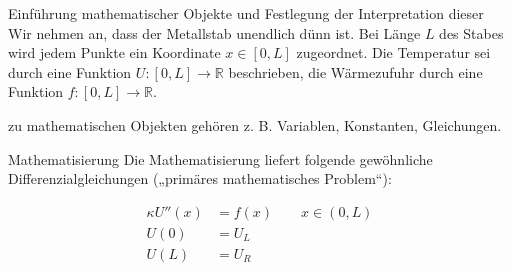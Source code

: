 \documentclass{mycourse}
\begin{document}
\begin{seg}{Einführung mathematischer Objekte und Festlegung der Interpretation dieser}
Wir nehmen an, dass der Metallstab unendlich dünn ist.
Bei Länge $L$ des Stabes wird jedem Punkte ein Koordinate $x \in [0,L]$ zugeordnet.
Die Temperatur sei durch eine Funktion $U:[0,L]\rightarrow \mathbb R$ beschrieben, die 
Wärmezufuhr durch eine Funktion $f : [0,L] \rightarrow \mathbb R$.
\end{seg}
\begin{note}
zu mathematischen Objekten gehören z. B. Variablen, Konstanten, Gleichungen.
\end{note}

\begin{seg}{Mathematisierung}
	Die Mathematisierung liefert folgende gewöhnliche Differenzialgleichungen („primäres mathematisches Problem“):

\begin{align*}
	\label{eq:1.1}
\kappa U''(x) &= f(x) \qquad	x \in (0,L)  \tag{1.1}\\ 
U(0) &= U_L \\	
U(L) &= U_R \\
\end{align*}
\end{seg}
\end{document}
